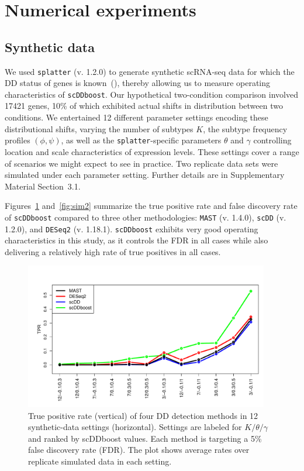 \documentclass[aoas,preprint]{imsart}
\begin{document}
 
\section{Numerical experiments}

\subsection{Synthetic data} 
We used \verb+splatter+ (v. 1.2.0)  
to generate synthetic scRNA-seq  data for which the DD status of genes is known~(\cite{ref:Zappia}), 
 thereby allowing us to 
measure operating characteristics of \verb+scDDboost+.  Our hypothetical two-condition comparison involved
17421 genes, 10\% of which exhibited actual shifts in distribution between two conditions. 
We entertained 12 different parameter settings encoding these distributional shifts, 
varying the number of subtypes $K$, the subtype frequency profiles $(\phi,\psi)$, as well
as the  \verb+splatter+-specific parameters $\theta$ and $\gamma$ controlling location and scale characteristics
of expression levels. These settings cover a range
of scenarios we might expect to see in practice.  Two replicate data sets were simulated under each parameter setting.
Further details are in Supplementary Material Section~3.1.   

Figures~\ref{fig:sim1} and~\ref{fig:sim2} summarize the true positive rate and false discovery rate
of \verb+scDDboost+ compared to three other methodologies: \verb+MAST+ (v. 1.4.0), \verb+scDD+ (v. 1.2.0), and 
\verb+DESeq2+ (v. 1.18.1). 
\verb+scDDboost+ exhibits very good operating characteristics in this study, as it controls the 
FDR in all cases while also delivering a relatively high rate of true positives in all cases.


\begin{figure}[H]
  \includegraphics[width = 0.95\textwidth]{Figs/simuTPR.pdf}
  \caption{True positive rate (vertical) of four DD detection methods in 12 synthetic-data settings (horizontal). 
  Settings are labeled for $K / \theta / \gamma$  and ranked by scDDboost values. Each method
 is targeting a 5\% false discovery rate (FDR). The plot shows  average rates over replicate simulated data
 in each setting.
   }
  \label{fig:sim1}
\end{figure}
\end{document}
